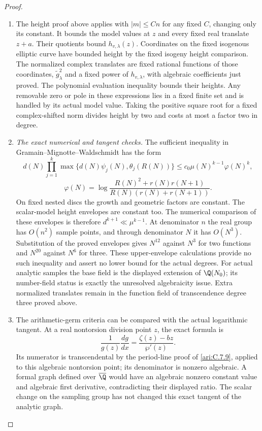 \begin{proof}
\begin{enumerate}[label=\arabic*.,leftmargin=*]
\item The height proof above applies with $|m|\le Cn$ for any fixed
$C$, changing only its constant. It bounds the model values at
$z$ and every fixed real translate $z+a$. Their quotients bound
$h_{v,\lambda}(z)$. Coordinates on the fixed isogenous elliptic
curve have bounded height by the fixed isogeny height comparison.
The normalized complex translates are fixed rational functions
of those coordinates, $\widetilde g_\lambda^2$ and a fixed power
of $h_{v,\lambda}$, with algebraic coefficients just proved.
The polynomial evaluation inequality bounds their heights.
Any removable zero or pole in these expressions lies in a fixed
finite set and is handled by its actual model value. Taking the
positive square root for a fixed complex-shifted norm divides
height by two and costs at most a factor two in degree.

\item \emph{The exact numerical and tangent checks.}
The sufficient inequality in Gramain--Mignotte--Waldschmidt
\citep[Theorem2.1,pp.101--102]{gramain1986values} has the form
\[
 d(N)\prod_{j=1}^k\max\{d(N)\psi_j(N),\theta_j(R(N))\}
 \le c_0\mu(N)^{k-1}\varphi(N)^k,
\]
\[
 \varphi(N)=\log\frac{R(N)^2+r(N)r(N+1)}
                         {R(N)(r(N)+r(N+1))}.
\]
On fixed nested discs the growth and geometric factors are
constant. The scalar-model height envelopes are constant too.
The numerical comparison of these envelopes is therefore
$d^{k+1}\ll\mu^{k-1}$. At denominator $n$ the real group
has $O(n^2)$ sample points, and through denominator $N$ it
has $O(N^3)$. Substitution of the proved envelopes gives
$N^{12}$ against $N^3$ for two functions and $N^{20}$ against
$N^6$ for three. These upper-envelope calculations provide
no such inequality and assert no lower bound for the actual
degrees. For actual analytic samples the base field is the
displayed extension of $\Q(N_0)$; its number-field status is
exactly the unresolved algebraicity issue. Extra normalized
translates remain in the function field of transcendence degree
three proved above.

\item The arithmetic-germ criteria
\citep[Theorem6.1]{herblot2012meromorphic}
\citep[Theorem4.16]{gasbarri2010analytic}
can be compared with the actual logarithmic tangent. At a real
nontorsion division point $z$, the exact formula is
\[
 \frac1{g(z)}\frac{dg}{dx}
       =\frac{\zeta(z)-bz}{\wp'(z)}.
\]
Its numerator is transcendental by the period-line proof of
\ref{ari:C.7.9}, applied to this algebraic nontorsion point;
its denominator is nonzero algebraic. A formal graph defined
over $\overline\Q$ would have an algebraic nonzero constant
value and algebraic first derivative, contradicting their
displayed ratio. The scalar change on the sampling group has
not changed this exact tangent of the analytic graph.


\end{enumerate}
\end{proof}
